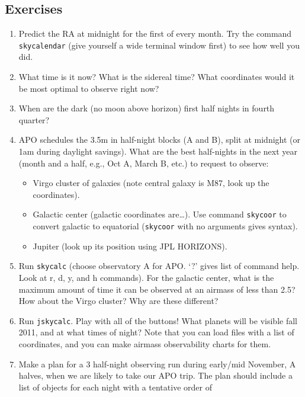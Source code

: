 \documentclass[12pt]{article}
\begin{document}
\subsection*{Exercises}
\begin{enumerate}[1.]
    \item Predict the RA at midnight for the first of every month.
        Try the command \texttt{skycalendar}
        (give yourself a wide terminal window first)
        to see how well you did.
    \item What time is it now? What is the sidereal time? What coordinates would
        it be most optimal to observe right now?
    \item When are the dark (no moon above horizon) first half nights in fourth
        quarter?
    \item APO schedules the 3.5m in half-night blocks (A and B), split at midnight
        (or 1am during daylight savings). What are the best half-nights in the next
        year (month and a half, e.g., Oct A, March B, etc.) to request to observe:
        \begin{itemize}
            \item Virgo cluster of galaxies (note central galaxy is M87,
                look up the coordinates).
            \item Galactic center (galactic coordinates are\ldots). Use command
                \texttt{skycoor} to convert galactic to equatorial
                (\texttt{skycoor} with no arguments gives syntax).
            \item Jupiter (look up its position using JPL HORIZONS).
        \end{itemize}
    \item Run \texttt{skycalc} (choose observatory A for APO.
        `?' gives list of command
        help. Look at r, d, y, and h commands). For the galactic center, what is
        the maximum amount of time it can be observed at an airmass of less than
        2.5? How about the Virgo cluster? Why are these different?
    \item Run \texttt{jskycalc}. Play with all of the buttons! What planets will be
        visible fall 2011, and at what times of night? Note that you can load
        files with a list of coordinates, and you can make airmass observability
        charts for them.
    \item Make a plan for a 3 half-night observing run during early/mid November,
        A halves, when we are likely to take our APO trip. The plan should
        include a list of objects for each night with a tentative order of

\end{enumerate}
\end{document}
